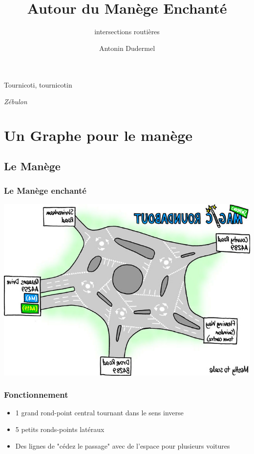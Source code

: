 \documentclass[slidetop,11pt]{beamer}
\title{Autour du Manège Enchanté}
\subtitle{intersections routières}
\date{}
\author{Antonin Dudermel}
\begin{document}

\frame{\titlepage}

\begin{frame}
	\epigraph{Tournicoti, tournicotin}{\it Zébulon}
\end{frame}

\begin{frame}
	\tableofcontents
\end{frame}

\section{Un Graphe pour le manège}
	\subsection{Le Manège}
\begin{frame}
	\frametitle{Le Manège enchanté}
	\begin{center}
		\includegraphics[scale=0.4]{./images/magic}
	\end{center}
\end{frame}

\begin{frame}
	\frametitle{Fonctionnement}
	\begin{itemize}
		\item 1 grand rond-point central tournant dans le sens inverse
		\item 5 petits ronds-points latéraux
		\item Des lignes de "cédez le passage" avec de l'espace pour plusieurs voitures
	\end{itemize}
\end{frame}
\end{document}
